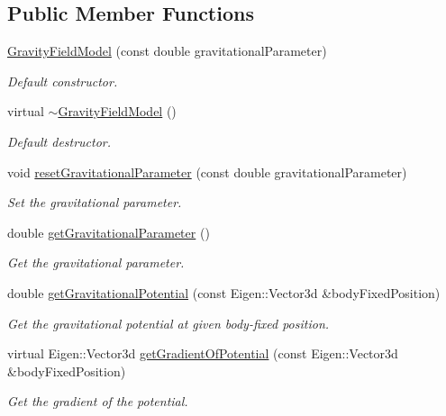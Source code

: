 \subsection*{Public Member Functions}
\begin{DoxyCompactItemize}
\item 
\hyperlink{classtudat_1_1gravitation_1_1GravityFieldModel_aff01dcf5db49f5dbacb92768080f0ff7}{Gravity\+Field\+Model} (const double gravitational\+Parameter)
\begin{DoxyCompactList}\small\item\em Default constructor. \end{DoxyCompactList}\item 
virtual \hyperlink{classtudat_1_1gravitation_1_1GravityFieldModel_ac07d5622f8ab741498c4f09891539378}{$\sim$\+Gravity\+Field\+Model} ()
\begin{DoxyCompactList}\small\item\em Default destructor. \end{DoxyCompactList}\item 
void \hyperlink{classtudat_1_1gravitation_1_1GravityFieldModel_abfd190adae679f7de648c44196415315}{reset\+Gravitational\+Parameter} (const double gravitational\+Parameter)
\begin{DoxyCompactList}\small\item\em Set the gravitational parameter. \end{DoxyCompactList}\item 
double \hyperlink{classtudat_1_1gravitation_1_1GravityFieldModel_a3bc2da209f97a04d2a79dd6e029e02d5}{get\+Gravitational\+Parameter} ()
\begin{DoxyCompactList}\small\item\em Get the gravitational parameter. \end{DoxyCompactList}\item 
double \hyperlink{classtudat_1_1gravitation_1_1GravityFieldModel_aec4e7e39757b3751afe4e3cd28a0b98b}{get\+Gravitational\+Potential} (const Eigen\+::\+Vector3d \&body\+Fixed\+Position)
\begin{DoxyCompactList}\small\item\em Get the gravitational potential at given body-\/fixed position. \end{DoxyCompactList}\item 
virtual Eigen\+::\+Vector3d \hyperlink{classtudat_1_1gravitation_1_1GravityFieldModel_a9b33395ebfd2a6bb1ee69c92a5b44b6b}{get\+Gradient\+Of\+Potential} (const Eigen\+::\+Vector3d \&body\+Fixed\+Position)
\begin{DoxyCompactList}\small\item\em Get the gradient of the potential. \end{DoxyCompactList}\end{DoxyCompactItemize}
